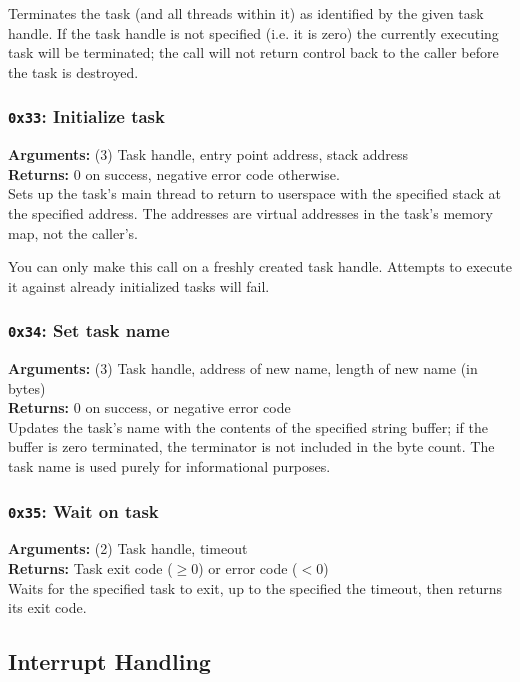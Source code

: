 \documentclass[11pt]{article}
\begin{document}
Terminates the task (and all threads within it) as identified by the given task handle. If the task handle is not specified (i.e. it is zero) the currently executing task will be terminated; the call will not return control back to the caller before the task is destroyed.

\subsubsection{{\tt 0x33}: Initialize task}
\textbf{Arguments:} (3) Task handle, entry point address, stack address \\
\textbf{Returns:} 0 on success, negative error code otherwise. \\

Sets up the task's main thread to return to userspace with the specified stack at the specified address. The addresses are virtual addresses in the task's memory map, not the caller's.

You can only make this call on a freshly created task handle. Attempts to execute it against already initialized tasks will fail.

\subsubsection{{\tt 0x34}: Set task name}
\textbf{Arguments:} (3) Task handle, address of new name, length of new name (in bytes) \\
\textbf{Returns:} 0 on success, or negative error code \\

Updates the task's name with the contents of the specified string buffer; if the buffer is zero terminated, the terminator is not included in the byte count. The task name is used purely for informational purposes.

\subsubsection{{\tt 0x35}: Wait on task}
\textbf{Arguments:} (2) Task handle, timeout \\
\textbf{Returns:} Task exit code ($\geq0$) or error code ($<0$) \\

Waits for the specified task to exit, up to the specified the timeout, then returns its exit code.



\newpage
\subsection{Interrupt Handling}
\end{document}
